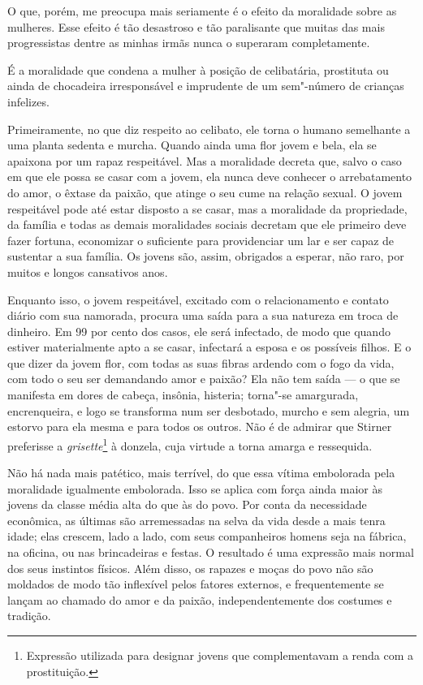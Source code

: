 
O que, porém, me preocupa mais seriamente é o efeito da moralidade sobre
as mulheres. Esse efeito é tão desastroso e tão paralisante que muitas
das mais progressistas dentre as minhas irmãs nunca o superaram
completamente.

É a moralidade que condena a mulher à posição de celibatária, prostituta
ou ainda de chocadeira irresponsável e imprudente de um sem"-número de
crianças infelizes.

Primeiramente, no que diz respeito ao celibato, ele torna o humano
semelhante a uma planta sedenta e murcha. Quando ainda uma flor jovem e
bela, ela se apaixona por um rapaz respeitável. Mas a moralidade decreta
que, salvo o caso em que ele possa se casar com a jovem, ela nunca deve
conhecer o arrebatamento do amor, o êxtase da paixão, que atinge o seu
cume na relação sexual. O jovem respeitável pode até estar disposto a se
casar, mas a moralidade da propriedade, da família e todas as demais
moralidades sociais decretam que ele primeiro deve fazer fortuna,
economizar o suficiente para providenciar um lar e ser capaz de
sustentar a sua família. Os jovens são, assim, obrigados a esperar, não
raro, por muitos e longos cansativos anos.

Enquanto isso, o jovem respeitável, excitado com o relacionamento e
contato diário com sua namorada, procura uma saída para a sua natureza em
troca de dinheiro. Em 99 por cento dos casos, ele será
infectado, de modo que quando estiver materialmente apto a se casar,
infectará a esposa e os possíveis filhos. E o que dizer da jovem flor,
com todas as suas fibras ardendo com o fogo da vida, com todo o seu ser
demandando amor e paixão? Ela não tem saída --- o que se manifesta em
dores de cabeça, insônia, histeria; torna"-se amargurada, encrenqueira, e
logo se transforma num ser desbotado, murcho e sem alegria, um estorvo
para ela mesma e para todos os outros. Não é de admirar que Stirner
preferisse a \textit{grisette}\footnote{Expressão utilizada para designar
  jovens que complementavam a renda com a prostituição.} à donzela, cuja
virtude a torna amarga e ressequida.

Não há nada mais patético, mais terrível, do que essa vítima embolorada
pela moralidade igualmente embolorada. Isso se aplica com força ainda
maior às jovens da classe média alta do que às do povo. Por conta da
necessidade econômica, as últimas são arremessadas na selva da vida
desde a mais tenra idade; elas crescem, lado a lado, com seus
companheiros homens seja na fábrica, na oficina, ou nas brincadeiras e
festas. O resultado é uma expressão mais normal dos seus instintos
físicos. Além disso, os rapazes e moças do povo não são moldados de modo\label{tradicao}
tão inflexível pelos fatores externos, e frequentemente se lançam ao
chamado do amor e da paixão, independentemente dos costumes e tradição.

